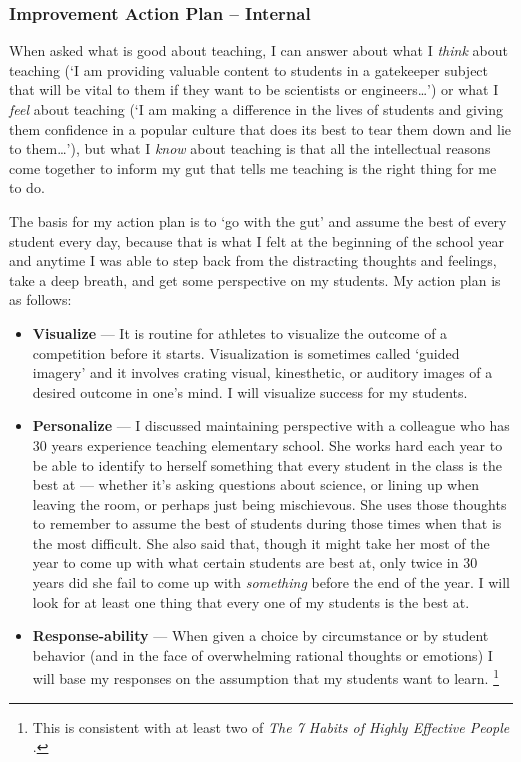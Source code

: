 \documentclass[11pt,twocolumn]{article}%
\begin{document}
\subsubsection{Improvement Action Plan -- Internal}
\label{Improvement Action Plan -- Internal}

When asked what is good about teaching, I can answer about what I
{\em think} about teaching (`I am providing valuable content to
students in a gatekeeper subject that will be vital to them if they
want to be scientists or engineers\dots') or what I {\em feel} about
teaching (`I am making a difference in the lives of students and
giving them confidence in a popular culture that does its best to
tear them down and lie to them\dots'), but what I {\em know} about
teaching is that all the intellectual reasons come together to
inform my gut that tells me teaching is the right thing for me to
do.

The basis for my action plan is to `go with the gut' and assume the
best of every student every day, because that is what I felt at the
beginning of the school year and anytime I was able to step back
from the distracting thoughts and feelings, take a deep breath, and
get some perspective on my students. My action plan is as follows:

\begin{itemize}

\item {\bf Visualize} --- It is routine for athletes to visualize the
outcome of a competition before it starts. Visualization is
sometimes called `guided imagery' and it involves crating visual,
kinesthetic, or auditory images of a desired outcome in one's mind.
I will visualize success for my students.

\item {\bf Personalize} --- I discussed maintaining perspective with
a colleague who has 30 years experience teaching elementary school.
She works hard each year to be able to identify to herself something
that every student in the class is the best at --- whether it's
asking questions about science, or lining up when leaving the room,
or perhaps just being mischievous. She uses those thoughts to
remember to assume the best of students during those times when that
is the most difficult. She also said that, though it might take her
most of the year to come up with what certain students are best at,
only twice in 30 years did she fail to come up with {\em something}
before the end of the year. I will look for at least one thing that
every one of my students is the best at.

\item {\bf Response-ability} --- When given a choice by circumstance
or by student behavior (and in the face of overwhelming rational
thoughts or emotions) I will base my responses on the assumption
that my students want to learn. \footnote{This is consistent with at
least two of {\em The 7 Habits of Highly Effective People}
\cite{book:7habits}.}

\end{itemize}
\end{document}
